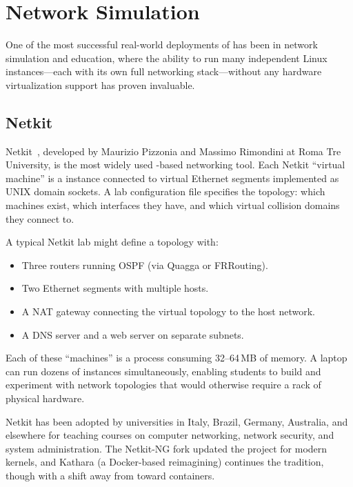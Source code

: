 \section{Network Simulation}
\label{sec:app-network}

One of the most successful real-world deployments of \UML{} has been
in network simulation and education, where the ability to run many
independent Linux instances---each with its own full networking
stack---without any hardware virtualization support has proven
invaluable.

\subsection{Netkit}

Netkit~\cite{pizzonia2008}, developed by Maurizio Pizzonia and Massimo
Rimondini at Roma Tre University, is the most widely used \UML{}-based
networking tool.  Each Netkit ``virtual machine'' is a \UML{} instance
connected to virtual Ethernet segments implemented as UNIX domain sockets.
A lab configuration file specifies the topology: which machines exist,
which interfaces they have, and which virtual collision domains they
connect to.

A typical Netkit lab might define a topology with:

\begin{itemize}[leftmargin=2em]
  \item Three routers running OSPF (via Quagga or FRRouting).
  \item Two Ethernet segments with multiple hosts.
  \item A NAT gateway connecting the virtual topology to the host network.
  \item A DNS server and a web server on separate subnets.
\end{itemize}

Each of these ``machines'' is a \UML{} process consuming 32--64\,MB of
memory.  A laptop can run dozens of instances simultaneously, enabling
students to build and experiment with network topologies that would
otherwise require a rack of physical hardware.

Netkit has been adopted by universities in Italy, Brazil, Germany,
Australia, and elsewhere for teaching courses on computer networking,
network security, and system administration.  The Netkit-NG fork
updated the project for modern kernels, and Kathara (a Docker-based
reimagining) continues the tradition, though with a shift away from
\UML{} toward containers.

